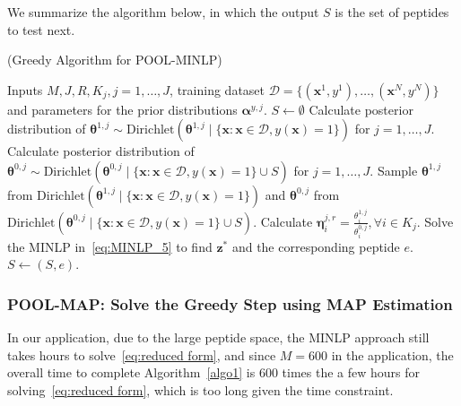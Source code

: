 We summarize the algorithm below, in which the output $S$ is the set of peptides to test next. 
\begin{Algorithm}(Greedy Algorithm for POOL-MINLP) \label{algo1}
\begin{algorithmic}[1]
  \REQUIRE Inputs $M, J, R, K_j, j = 1, \ldots, J$, training dataset $\mathcal{D} = 
  \{(\bm{x}^1, y^1), \ldots, (\bm{x}^N, y^N)\}$ and parameters for the prior 
  distributions $\bm{\alpha}^{y, j}$.
  \STATE $S \leftarrow \emptyset $
  \STATE Calculate posterior distribution of $\bm{\theta}^{1, j} \sim 
  \text{Dirichlet} (\bm{\theta}^{1, j} \mid \{\bm{x}: \bm{x} \in \mathcal{D}, 
  y(\bm{x}) = 1\})$ for $j = 1, \ldots, J$.
    \STATE Calculate posterior distribution of $\bm{\theta}^{0, j} \sim 
    \text{Dirichlet} (\bm{\theta}^{0, j} \mid \{\bm{x}: \bm{x} \in \mathcal{D}, 
    y(\bm{x}) = 1\} \cup S)$ for $j = 1, \ldots, J$.
          \STATE Sample $\bm{\theta}^{1, j}$ from $\text{Dirichlet} (\bm{\theta}^{1, j} 
          \mid \{\bm{x}: \bm{x} \in \mathcal{D}, y(\bm{x}) = 1\})$ and $\bm{\theta}^{0, j}$
          from $\text{Dirichlet} (\bm{\theta}^{0, j} \mid \{\bm{x}: \bm{x} \in \mathcal{D}, 
          y(\bm{x}) = 1\} \cup S)$.
          \STATE Calculate $\bm{\eta}^{j, r}_i = \frac{\theta^{1, j}_i}{\theta^{0, j}_i}, \forall i \in K_j$.
      \ENDFOR
    \ENDFOR
    \STATE Solve the MINLP in~\eqref{eq:MINLP_5} to find $\bm{z}^*$ and the corresponding peptide $e$.
    \STATE $S \leftarrow (S, e)$.
  \ENDFOR
\end{algorithmic}
\end{Algorithm}

\subsubsection{POOL-MAP: Solve the Greedy Step using MAP Estimation} \label{sec:MAP approach}
In our application, due to the large peptide space, the MINLP approach still takes hours to solve~\eqref{eq:reduced form}, and since
$M=600$ in the application, the overall time to complete Algorithm~\ref{algo1} is $600$ times the a few hours for solving~\eqref{eq:reduced form},
which is too long given the time constraint.


